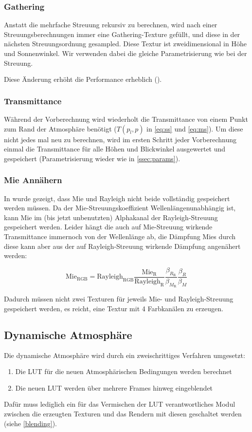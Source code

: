 \subsubsection{Gathering}
Anstatt die mehrfache Streuung rekursiv zu berechnen, wird nach einer Streuungsberechnungen immer eine Gathering-Texture
gefüllt, und diese in der nächsten Streuungsordnung gesampled. Diese Textur ist zweidimensional in Höhe und
Sonnenwinkel. Wir verwenden dabei die gleiche Parametrisierung wie bei der Streuung.

Diese Änderung erhöht die Performance erheblich (\cite{Bodare14}). 

\subsubsection{Transmittance}
Während der Vorberechnung wird wiederholt die Transmittance von einem Punkt zum Rand der Atmosphäre benötigt ($T(p_l,
p)$ in \cref{eq:ss} und \cref{eq:ms}). Um diese nicht jedes mal neu zu berechnen, wird im ersten Schritt jeder
Vorberechnung einmal die Transmittance für alle Höhen und Blickwinkel ausgewertet und gespeichert (Parametrisierung
wieder wie in \cref{ssec:params}).

\subsubsection{Mie Annähern}
In \cite{Bruneton08} wurde gezeigt, dass Mie und Rayleigh nicht beide vollständig gespeichert werden müssen. Da der
Mie-Streuungskoeffizient Wellenlängenunabhängig ist, kann Mie im (bis jetzt unbenutzten) Alphakanal der
Rayleigh-Streuung gespeichert werden. Leider hängt die auch auf Mie-Streuung wirkende Transmittance immernoch von der
Wellenlänge ab, die Dämpfung Mies durch diese kann aber aus der auf Rayleigh-Streuung wirkende Dämpfung angenähert
werden:

\begin{equation*}
	\text{Mie}_\text{RGB}=\text{Rayleigh}_\text{RGB}
	\frac{\text{Mie}_\text{R}}{\text{Rayleigh}_\text{R}}
	\frac{\beta_{R_\text{R}}}{\beta_{M_\text{R}}}
	\frac{\beta_R}{\beta_M}
\end{equation*}

Dadurch müssen nicht zwei Texturen für jeweils Mie- und Rayleigh-Streuung gespeichert werden, es reicht, eine Textur mit
4 Farbkanälen zu erzeugen.

\subsection{Dynamische Atmosphäre}
Die dynamische Atmosphäre wird durch ein zweischrittiges Verfahren umgesetzt:
\begin{enumerate}
	\item Die LUT für die neuen Atmosphärischen Bedingungen werden berechnet
	\item Die neuen LUT werden über mehrere Frames hinweg eingeblendet
\end{enumerate}
Dafür muss lediglich ein für das Vermischen der LUT verantwortliches Modul zwischen die erzeugten Texturen und das
Rendern mit diesen geschaltet werden (siehe \cref{blending}).\\

